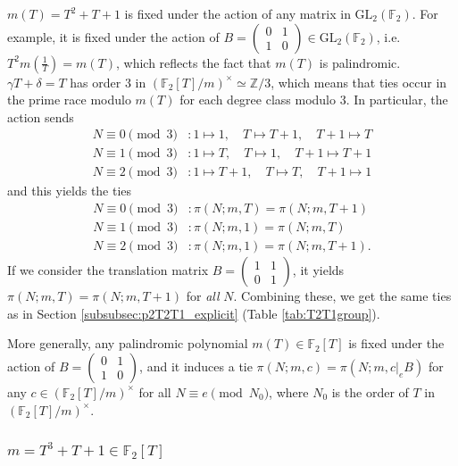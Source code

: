 \documentclass[10pt,reqno]{amsproc}
\newcommand{\GL}{\mathrm{GL}}
\newcommand{\bF}{\mathbb{F}}
\newcommand{\bZ}{\mathbb{Z}}
\newcommand{\1}{\mathds{1}}	%
\theoremstyle{definition}
\theoremstyle{remark}
\begin{document}
$m(T) = T^2 + T + 1$ is fixed under the action of any matrix in $\GL_2(\bF_2)$.
For example, it is fixed under the action of $B = \left(\begin{smallmatrix} 0 & 1 \\ 1 & 0 \end{smallmatrix} \right) \in \GL_2(\bF_2)$, i.e. $T^2 m\left(\frac{1}{T}\right) = m(T)$, which reflects the fact that $m(T)$ is palindromic.
$\gamma T + \delta = T$ has order $3$ in $(\bF_2[T] / m)^\times \simeq \bZ/3$, which means that ties occur in the prime race modulo $m(T)$ for each degree class modulo $3$.
In particular, the action sends
\begin{align*}
    N \equiv 0 \pmod{3} &: 1 \mapsto 1, \quad T \mapsto T + 1, \quad T+1 \mapsto T \\
    N \equiv 1 \pmod{3} &: 1 \mapsto T, \quad T \mapsto 1, \quad T + 1 \mapsto T + 1 \\
    N \equiv 2 \pmod{3} &: 1 \mapsto T + 1, \quad T \mapsto T, \quad T + 1 \mapsto 1
\end{align*}
and this yields the ties
\begin{align*}
    N \equiv 0 \pmod{3} &: \pi(N; m, T) = \pi(N; m, T+1) \\
    N \equiv 1 \pmod{3} &: \pi(N; m, 1) = \pi(N; m, T) \\
    N \equiv 2 \pmod{3} &: \pi(N; m, 1) = \pi(N; m, T+1).
\end{align*}
If we consider the translation matrix $B = \left(\begin{smallmatrix} 1 &1 \\ 0 & 1 \end{smallmatrix}\right)$, it yields $\pi(N; m, T) = \pi(N; m, T + 1)$ for \emph{all} $N$.
Combining these, we get the same ties as in Section \ref{subsubsec:p2T2T1_explicit} (Table \ref{tab:T2T1group}).

More generally, any palindromic polynomial $m(T) \in \bF_2[T]$ is fixed under the action of $B = \left(\begin{smallmatrix} 0 & 1 \\ 1 & 0 \end{smallmatrix}\right)$, and it induces a tie $\pi(N; m, c) = \pi(N; m, c|_e B)$ for any $c \in (\bF_2[T] / m)^\times$ for all $N \equiv e \pmod{N_0}$, where $N_0$ is the order of $T$ in $(\bF_2[T] / m)^\times$.

\subsubsection{\texorpdfstring{\(m = T^3 + T + 1 \in \bF_2[T]\)}{m = T^3 + T + 1 over characteristic 2}}
\label{subsec:bij_T3T1}
\end{document}
